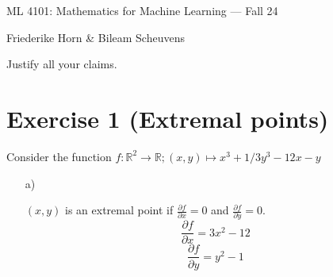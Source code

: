 \documentclass[10pt]{article}
\numberwithin{equation}{section}
\begin{document}
\begin{center}
    \sc ML 4101: Mathematics for Machine Learning --- Fall 24
\end{center}

\noindent Friederike Horn \& Bileam Scheuvens

Justify all your claims.
\section*{Exercise 1 (Extremal points)}
Consider the function $f: \mathbb{R}^2 \to \mathbb{R}; (x, y) \mapsto x^3 + 1/3y^3 -12x -y$
\begin{enumerate}
\item[a)]{
$(x, y)$ is an extremal point if $\frac{\partial f}{\partial x}=0$ and $\frac{\partial f}{\partial y} = 0$. \\
$$\frac{\partial f}{\partial x} = 3 x^2 -12$$
$$\frac{\partial f}{\partial y} = y^2 -1$$

}
\end{enumerate}
\end{document}
